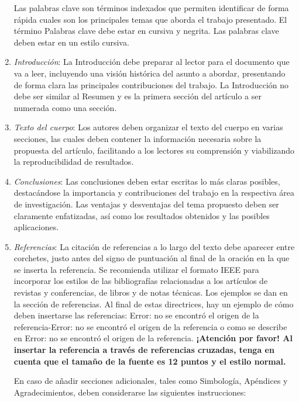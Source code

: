\documentclass[a4paper, 12pt]{article}
\begin{document}
\begin{enumerate}[label=\arabic*)]
    Las palabras clave son términos indexados que permiten identificar de forma rápida cuales son los principales temas que aborda el trabajo presentado. El término Palabras clave debe estar en cursiva y negrita. Las palabras clave deben estar en un estilo cursiva.

    \item \textit{Introducción}: La Introducción debe preparar al lector para el documento que va a leer, incluyendo una visión histórica del asunto a abordar, presentando de forma clara las principales contribuciones del trabajo. La Introducción no debe ser similar al Resumen y es la primera sección del artículo a ser numerada como una sección.

    \item \textit{Texto del cuerpo}: Los autores deben organizar el texto del cuerpo en varias secciones, las cuales deben contener la información necesaria sobre la propuesta del artículo, facilitando a los lectores su comprensión y viabilizando la reproducibilidad de resultados.

    \item \textit{Conclusiones}: Las conclusiones deben estar escritas lo más claras posibles, destacándose la importancia y contribuciones del trabajo en la respectiva área de investigación. Las ventajas y desventajas del tema propuesto deben ser claramente enfatizadas, así como los resultados obtenidos y las posibles aplicaciones.

    \item \textit{Referencias}: La citación de referencias a lo largo del texto debe aparecer entre corchetes, justo antes del signo de puntuación al final de la oración en la que se inserta la referencia. Se recomienda utilizar el formato IEEE para incorporar los estilos de las bibliografías relacionadas a los artículos de revistas y conferencias, de libros y de notas técnicas. Los ejemplos se dan en la sección de referencias. Al final de estas directrices, hay un ejemplo de cómo deben insertarse las referencias: Error: no se encontró el origen de la referencia-Error: no se encontró el origen de la referencia o como se describe en Error: no se encontró el origen de la referencia. \textbf{¡Atención por favor! Al insertar la referencia a través de referencias cruzadas, tenga en cuenta que el tamaño de la fuente es 12 puntos y el estilo normal.}

    En caso de añadir secciones adicionales, tales como Simbología, Apéndices y Agradecimientos, deben considerarse las siguientes instrucciones:


\end{enumerate}
\end{document}

